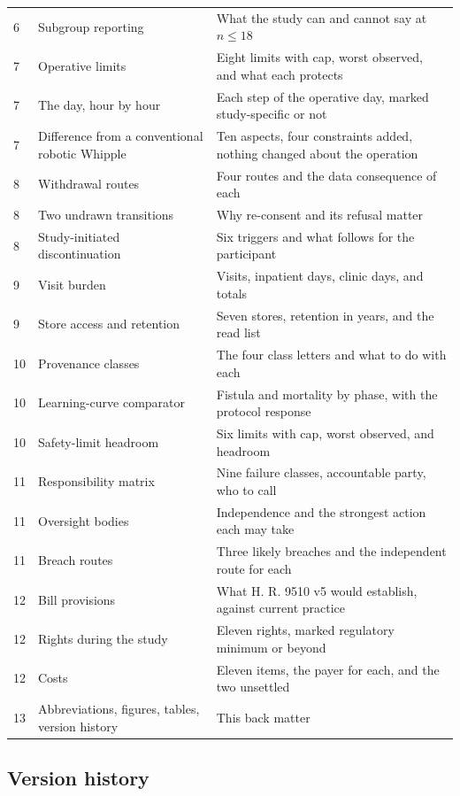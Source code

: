 \begin{xltabular}{\textwidth}{C{1.0cm} L{4.6cm} Y}
6 & Subgroup reporting & What the study can and cannot say at $n \leq 18$ \\
7 & Operative limits & Eight limits with cap, worst observed, and what each protects \\
7 & The day, hour by hour & Each step of the operative day, marked study-specific or not \\
7 & Difference from a conventional robotic Whipple & Ten aspects, four constraints added, nothing changed about the operation \\
8 & Withdrawal routes & Four routes and the data consequence of each \\
8 & Two undrawn transitions & Why re-consent and its refusal matter \\
8 & Study-initiated discontinuation & Six triggers and what follows for the participant \\
9 & Visit burden & Visits, inpatient days, clinic days, and totals \\
9 & Store access and retention & Seven stores, retention in years, and the read list \\
10 & Provenance classes & The four class letters and what to do with each \\
10 & Learning-curve comparator & Fistula and mortality by phase, with the protocol response \\
10 & Safety-limit headroom & Six limits with cap, worst observed, and headroom \\
11 & Responsibility matrix & Nine failure classes, accountable party, who to call \\
11 & Oversight bodies & Independence and the strongest action each may take \\
11 & Breach routes & Three likely breaches and the independent route for each \\
12 & Bill provisions & What H. R. 9510 v5 would establish, against current practice \\
12 & Rights during the study & Eleven rights, marked regulatory minimum or beyond \\
12 & Costs & Eleven items, the payer for each, and the two unsettled \\
13 & Abbreviations, figures, tables, version history & This back matter \\
\end{xltabular}

\vspace{0.30em}

\subsection{Version history}

